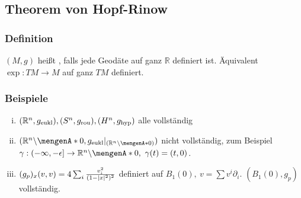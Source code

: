 
\subsection{Theorem von Hopf-Rinow}
\label{sub:26}

\subsubsection{Definition}
\label{ssub:251}
$(M,g)$ heißt , falls jede Geodäte auf ganz $\mathds{R}$ definiert ist. Äquivalent $\exp: TM\to M$ auf ganz $TM$ definiert.

\subsubsection{Beispiele}
\label{ssub:252}
\begin{enumerate}[(i)]
\item $(\mathbb{R}^n,g_{\text{eukl}}),(S^n,g_{\text{rou}}),(H^n,g_{\text{hyp}})$ alle vollständig
\item $\enbrace{\mathds{R}^n\backslash \set{0},g_{\text{eukl}}\vert_{\enbrace{\mathds{R}^n\backslash \set{0}}}}$ nicht vollständig, zum Beispiel $\gamma:(-\infty,-\epsilon] \to \mathds{R}^n\backslash \set{0},\ \gamma(t) = (t,0)$.
\item $(g_p)_x (v,v) = 4\sum_i \frac{v_i^2}{(1-\lvert x\rvert^2)^2}$ definiert  auf $B_1(0),\ v=\sum v^i \partial_i$. $(B_1(0),g_p)$ vollständig.
\end{enumerate}

